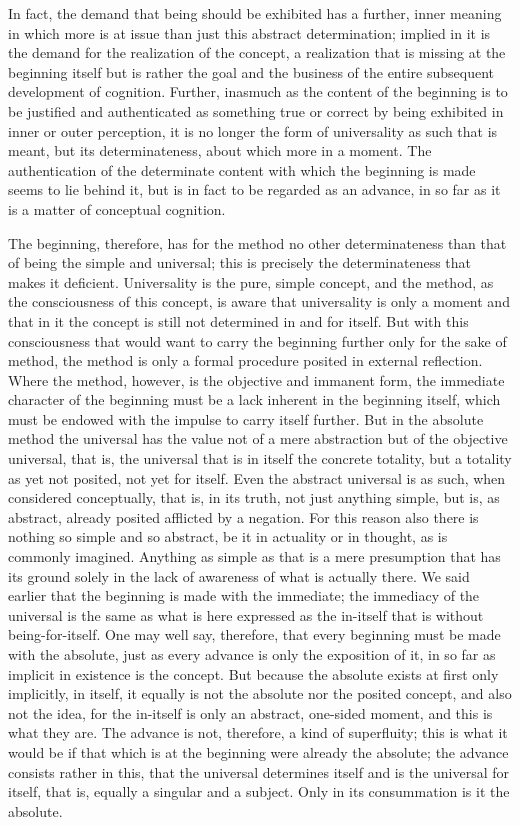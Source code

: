 In fact, the demand that being should be exhibited has
a further, inner meaning in which more is at issue
than just this abstract determination;
implied in it is the demand for the realization of the concept,
a realization that is missing at the beginning itself
but is rather the goal and the business of the
entire subsequent development of cognition.
Further, inasmuch as the content of the beginning is
to be justified and authenticated as something true or correct
by being exhibited in inner or outer perception,
it is no longer the form of universality as such
that is meant, but its determinateness,
about which more in a moment.
The authentication of the determinate content
with which the beginning is made seems to lie behind it,
but is in fact to be regarded as an advance,
in so far as it is a matter of conceptual cognition.

The beginning, therefore, has for the method no other determinateness
than that of being the simple and universal;
this is precisely the determinateness that makes it deficient.
Universality is the pure, simple concept,
and the method, as the consciousness of this concept,
is aware that universality is only a moment
and that in it the concept is still not determined in and for itself.
But with this consciousness that would want to carry
the beginning further only for the sake of method,
the method is only a formal procedure
posited in external reflection.
Where the method, however,
is the objective and immanent form,
the immediate character of the beginning must be
a lack inherent in the beginning itself,
which must be endowed with the
impulse to carry itself further.
But in the absolute method the universal
has the value not of a mere abstraction
but of the objective universal, that is,
the universal that is in itself the concrete totality,
but a totality as yet not posited, not yet for itself.
Even the abstract universal is as such,
when considered conceptually, that is, in its truth,
not just anything simple, but is, as abstract,
already posited afflicted by a negation.
For this reason also there is nothing so simple and so abstract,
be it in actuality or in thought, as is commonly imagined.
Anything as simple as that is a mere presumption
that has its ground solely in the lack of
awareness of what is actually there.
We said earlier that the beginning is
made with the immediate;
the immediacy of the universal is the same as
what is here expressed as the in-itself
that is without being-for-itself.
One may well say, therefore, that every
beginning must be made with the absolute,
just as every advance is only the exposition of it,
in so far as implicit in existence is the concept.
But because the absolute exists
at first only implicitly, in itself,
it equally is not the absolute
nor the posited concept,
and also not the idea,
for the in-itself is only
an abstract, one-sided moment,
and this is what they are.
The advance is not, therefore, a kind of superfluity;
this is what it would be if that which is
at the beginning were already the absolute;
the advance consists rather in this,
that the universal determines itself
and is the universal for itself,
that is, equally a singular and a subject.
Only in its consummation is it the absolute.

